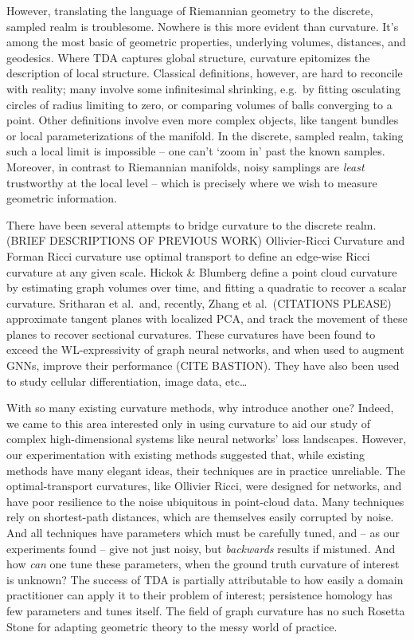 \documentclass[
  letterpaper,
  DIV=11,
  numbers=noendperiod]{scrartcl}
\theoremstyle{plain}
\theoremstyle{definition}
\theoremstyle{plain}
\theoremstyle{definition}
\theoremstyle{plain}
\theoremstyle{remark}
\begin{document}
However, translating the language of Riemannian geometry to the
discrete, sampled realm is troublesome. Nowhere is this more evident
than curvature. It's among the most basic of geometric properties,
underlying volumes, distances, and geodesics. Where TDA captures global
structure, curvature epitomizes the description of local structure.
Classical definitions, however, are hard to reconcile with reality; many
involve some infinitesimal shrinking, e.g.~by fitting osculating circles
of radius limiting to zero, or comparing volumes of balls converging to
a point. Other definitions involve even more complex objects, like
tangent bundles or local parameterizations of the manifold. In the
discrete, sampled realm, taking such a local limit is impossible -- one
can't `zoom in' past the known samples. Moreover, in contrast to
Riemannian manifolds, noisy samplings are \emph{least} trustworthy at
the local level -- which is precisely where we wish to measure geometric
information.

There have been several attempts to bridge curvature to the discrete
realm. (BRIEF DESCRIPTIONS OF PREVIOUS WORK) Ollivier-Ricci Curvature
and Forman Ricci curvature use optimal transport to define an edge-wise
Ricci curvature at any given scale. Hickok \& Blumberg define a point
cloud curvature by estimating graph volumes over time, and fitting a
quadratic to recover a scalar curvature. Sritharan et al.~and, recently,
Zhang et al.~(CITATIONS PLEASE) approximate tangent planes with
localized PCA, and track the movement of these planes to recover
sectional curvatures. These curvatures have been found to exceed the
WL-expressivity of graph neural networks, and when used to augment GNNs,
improve their performance (CITE BASTION). They have also been used to
study cellular differentiation, image data, etc\ldots{}

With so many existing curvature methods, why introduce another one?
Indeed, we came to this area interested only in using curvature to aid
our study of complex high-dimensional systems like neural networks' loss
landscapes. However, our experimentation with existing methods suggested
that, while existing methods have many elegant ideas, their techniques
are in practice unreliable. The optimal-transport curvatures, like
Ollivier Ricci, were designed for networks, and have poor resilience to
the noise ubiquitous in point-cloud data. Many techniques rely on
shortest-path distances, which are themselves easily corrupted by noise.
And all techniques have parameters which must be carefully tuned, and --
as our experiments found -- give not just noisy, but \emph{backwards}
results if mistuned. And how \emph{can} one tune these parameters, when
the ground truth curvature of interest is unknown? The success of TDA is
partially attributable to how easily a domain practitioner can apply it
to their problem of interest; persistence homology has few parameters
and tunes itself. The field of graph curvature has no such Rosetta Stone
for adapting geometric theory to the messy world of practice.
\end{document}
